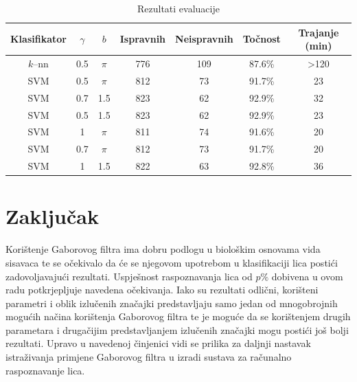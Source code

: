 \documentclass{ru}
\begin{document}
\begin{table}[ht]
\caption{Rezultati evaluacije}
\centering
\begin{tabular}{c c c c c c c}
\hline\hline
Klasifikator & $\gamma$ & $b$ & Ispravnih & Neispravnih &
Točnost & Trajanje (min) \\ [0.5ex]
\hline
$k$--nn & 0.5 & $\pi$ & 776 & 109 & 87.6\% & >120 \\
SVM & 0.5 & $\pi$ & 812  & 73 & 91.7\% & 23 \\
SVM & 0.7 & 1.5 & 823  & 62 & 92.9\% & 32\\
SVM & 0.5 & 1.5 & 823  & 62 & 92.9\% & 23\\
SVM & 1 & $\pi$ & 811  & 74 & 91.6\% & 20\\
SVM & 0.7 & $\pi$ & 812  & 73 & 91.7\% & 20\\
SVM & 1 & 1.5 & 822  & 63 & 92.8\% & 36\\ [1ex]
\hline
\end{tabular}
\label{tbl:eval}
\end{table}

\chapter{Zaključak}

Korištenje Gaborovog filtra ima dobru podlogu u biološkim osnovama vida
sisavaca te se očekivalo da će se njegovom upotrebom u klasifikaciji lica
postići zadovoljavajući rezultati. Uspješnost raspoznavanja lica od $p\%$
dobivena u ovom radu potkrjepljuje navedena očekivanja. Iako su rezultati
odlični, korišteni parametri i oblik izlučenih značajki predstavljaju
samo jedan od mnogobrojnih mogućih načina korištenja Gaborovog filtra te je
moguće da se korištenjem drugih parametara i drugačijim predstavljanjem
izlučenih značajki mogu postići još bolji rezultati. Upravo u navedenoj
činjenici vidi se prilika za daljnji nastavak istraživanja primjene Gaborovog
filtra u izradi sustava za računalno raspoznavanje lica.



\end{document}
